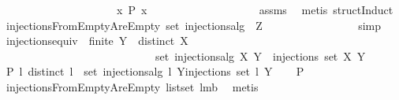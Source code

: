 \begin{isabellebody}
\ \ \ \ \ \ \ \ \ \ \ \ \ \ \ \ \ \ \ \ \ {\isachardoublequoteopen}{\isasymforall}x{\isachardot}\ P\ x{\isachardoublequoteclose}\isanewline
%
\isadelimproof
\ \ \ \ \ \ \ \ \ \ \ \ \ \ \ \ \ \ %
\endisadelimproof
%
\isatagproof
{}\isamarkupfalse%
\ assms\ \isamarkupfalse%
\ {\isacharparenleft}metis\ structInduct{\isacharparenright}%
\endisatagproof
{\isafoldproof}%
%
\isadelimproof
\isanewline
%
\endisadelimproof
\isanewline
{}\isamarkupfalse%
\ injectionsFromEmptyAreEmpty{\isacharcolon}\ {\isachardoublequoteopen}set\ {\isacharparenleft}injections{\isacharunderscore}alg\ {\isacharbrackleft}{\isacharbrackright}\ Z{\isacharparenright}\ {\isacharequal}\ {\isacharbraceleft}{\isacharbraceleft}{\isacharbraceright}{\isacharbraceright}{\isachardoublequoteclose}\ \isanewline
%
\isadelimproof
\ \ \ \ \ \ \ \ \ \ \ \ %
\endisadelimproof
%
\isatagproof
{}\isamarkupfalse%
\ simp%
\endisatagproof
{\isafoldproof}%
%
\isadelimproof
\isanewline
%
\endisadelimproof
\isanewline
{}\isamarkupfalse%
\ injections{\isacharunderscore}equiv{\isacharcolon}\ \ {\isachardoublequoteopen}finite\ Y{\isachardoublequoteclose}\ \ {\isachardoublequoteopen}distinct\ X{\isachardoublequoteclose}\ \isanewline
\ \ \ \ \ \ \ \ \ \ \ \ \ \ \ \ \ \ \ \ \ \ \ \ \ \ \ \ {\isachardoublequoteopen}set\ {\isacharparenleft}injections{\isacharunderscore}alg\ X\ Y{\isacharparenright}\ {\isacharequal}\ injections\ {\isacharparenleft}set\ X{\isacharparenright}\ Y{\isachardoublequoteclose}\isanewline
%
\isadelimproof
%
\endisadelimproof
%
\isatagproof
{}\isamarkupfalse%
\ {\isacharminus}\isanewline
\ \ \isamarkupfalse%
\ {\isacharquery}P{\isacharequal}{\isachardoublequoteopen}{\isasymlambda}\ l{\isachardot}\ {\isacharparenleft}distinct\ l\ {\isasymlongrightarrow}\ {\isacharparenleft}set\ {\isacharparenleft}injections{\isacharunderscore}alg\ l\ Y{\isacharparenright}{\isacharequal}injections\ {\isacharparenleft}set\ l{\isacharparenright}\ Y{\isacharparenright}{\isacharparenright}{\isachardoublequoteclose}\isanewline
\ \ \isamarkupfalse%
\ {\isachardoublequoteopen}{\isacharquery}P\ {\isacharbrackleft}{\isacharbrackright}{\isachardoublequoteclose}\ \isamarkupfalse%
\ injectionsFromEmptyAreEmpty\ list{\isachardot}set{\isacharparenleft}{}{\isacharparenright}\ lm{}{}b\ \isamarkupfalse%
\ {\isacharparenleft}metis{\isacharparenright}\isanewline
\ \ \isamarkupfalse%

\end{isabellebody}
